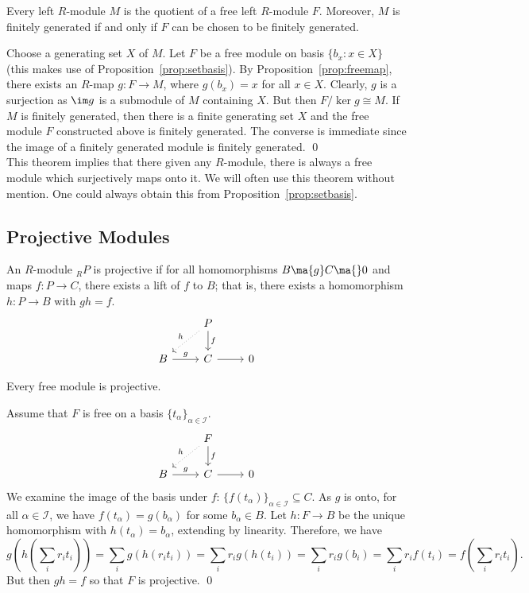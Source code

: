 \begin{thm}
Every left $R$-module $M$ is the quotient of a free left $R$-module $F$. Moreover, $M$ is finitely generated if and only if $F$ can be chosen to be finitely generated. 
\end{thm}

\pf Choose a generating set $X$ of $M$. Let $F$ be a free module on basis $\{b_x \colon x \in X\}$ (this makes use of Proposition~\ref{prop:setbasis}). By Proposition~\ref{prop:freemap}, there exists an $R$-map $g: F \to M$, where $g(b_x)=x$ for all $x \in X$. Clearly, $g$ is a surjection as $\im g$ is a submodule of $M$ containing $X$. But then $F/\ker g \cong M$. If $M$ is finitely generated, then there is a finite generating set $X$ and the free module $F$ constructed above is finitely generated. The converse is immediate since the image of a finitely generated module is finitely generated. \qed \\

This theorem implies that there given any $R$-module, there is always a free module which surjectively maps onto it. We will often use this theorem without mention. One could always obtain this from Proposition~\ref{prop:setbasis}. 


\subsection{Projective Modules}


\begin{dfn}
An $R$-module $_R P$ is projective if for all homomorphisms $B \ma{g} C \ma{} 0$ and maps $f: P \to C$, there exists a lift of $f$ to $B$; that is, there exists a homomorphism $h: P \to B$ with $gh= f$.
	\[
	\begin{tikzcd}
	& P \arrow{d}{f} \arrow[dotted,swap]{dl}{h} & \\
	B \arrow{r}{g} & C \arrow{r} & 0
	\end{tikzcd}
	\]
\end{dfn}


\begin{lem}
Every free module is projective.
\end{lem}

\pf Assume that $F$ is free on a basis $\{t_\alpha\}_{\alpha \in \mathcal{I}}$. 
	\[
	\begin{tikzcd}
	& F \arrow{d}{f} \arrow[dotted,swap]{dl}{h} & \\
	B \arrow{r}{g} & C \arrow{r} & 0
	\end{tikzcd}
	\]
We examine the image of the basis under $f$: $\{f(t_\alpha)\}_{\alpha \in \mathcal{I}} \subseteq C$. As $g$ is onto, for all $\alpha \in \mathcal{I}$, we have $f(t_\alpha)= g(b_\alpha)$ for some $b_\alpha \in B$. Let $h: F \to B$ be the unique homomorphism with $h(t_\alpha)= b_\alpha$, extending by linearity. Therefore, we have
	\[
	g\left( h\left( \sum_i r_i t_i \right)\right) =  \sum_i g(h(r_it_i))= \sum_i r_i g(h(t_i))= \sum_i r_i g(b_i)= \sum_i r_i f(t_i)=  f\left(\sum_i r_it_i\right).
	\]
But then $gh=f$ so that $F$ is projective. \qed \\


